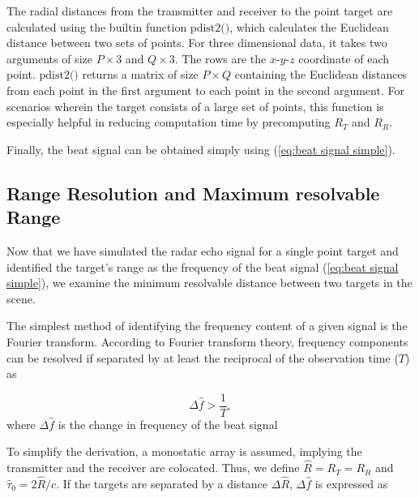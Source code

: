 

The radial distances from the transmitter and receiver to the point target are calculated using the builtin function $\text{pdist2()}$, which calculates the Euclidean distance between two sets of points. For three dimensional data, it takes two arguments of size $P \times 3$ and $Q \times 3$. The rows are the $x$-$y$-$z$ coordinate of each point. $\text{pdist2()}$ returns a matrix of size $P \times Q$ containing the Euclidean distances from each point in the first argument to each point in the second argument. For scenarios wherein the target consists of a large set of points, this function is especially helpful in reducing computation time by precomputing $R_T$ and $R_R$.



Finally, the beat signal can be obtained simply using (\ref{eq:beat signal simple}).




\subsection{Range Resolution and Maximum resolvable Range}
\label{subsec:range resolution}
Now that we have simulated the radar echo signal for a single point target and identified the target's range as the frequency of the beat signal (\ref{eq:beat signal simple}), we examine the minimum resolvable distance between two targets in the scene. 

The simplest method of identifying the frequency content of a given signal is the Fourier transform. According to Fourier transform theory, frequency components can be resolved if separated by at least the reciprocal of the observation time ($T$) as

\begin{equation}
	\label{eq:deltahat 1}
	\Delta \hat{f} > \frac{1}{T},
\end{equation}
where $\Delta \hat{f}$ is the change in frequency of the beat signal

To simplify the derivation, a monostatic array is assumed, implying the transmitter and the receiver are colocated. Thus, we define $\hat{R} = R_T = R_R$ and $\hat{\tau}_0 = 2\hat{R}/c$. If the targets are separated by a distance $\Delta \hat{R}$, $\Delta \hat{f}$ is expressed as

